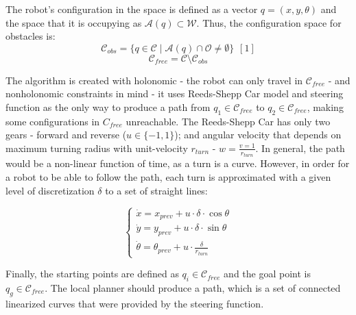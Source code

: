 \documentclass[a4paper,12pt]{article}
\DeclareRobustCommand{\[}{\begin{equation}}
\DeclareRobustCommand{\]}{\end{equation}}
\numberwithin{equation}{section}
\numberwithin{algorithm}{section}
\begin{document}
The robot's configuration in the space is defined as a vector $q=(x,y,\theta)$ and the space that it is occupying as $\mathcal{A}(q)\subset\mathcal{W}$.
Thus, the configuration space for obstacles is:
\[
\mathcal{C}_{obs}=\{q\in\mathcal{C}\mid\mathcal{A}(q)\cap\mathcal{O}\neq\emptyset \}\hspace{5pt}[1]
\]
\[
\mathcal{C}_{free}=\mathcal{C}\setminus\mathcal{C}_{obs}
\]

The algorithm is created with holonomic - the robot can only travel in $\mathcal{C}_{free}$ - and nonholonomic constraints in mind - it uses Reeds-Shepp Car model and steering function as the only way to produce a path from $q_1\in\mathcal{C}_{free}$ to $q_2\in\mathcal{C}_{free}$, making some configurations in $C_{free}$ unreachable. The Reeds-Shepp Car has only two gears - forward and reverse ($u\in\{-1,1\}$); and angular velocity that depends on maximum turning radius with unit-velocity $r_{turn}$ - $w = \frac{v=1}{r_{turn}}$. In general, the path would be a non-linear function of time, as a turn is a curve. However, in order for a robot to be able to follow the path, each turn is approximated with a given level of discretization $\delta$ to a set of straight lines:

\[
\begin{cases}
\dot{x}=x_{prev} + u\cdot\delta\cdot\cos{\theta}\\
\dot{y}=y_{prev} + u\cdot\delta\cdot\sin{\theta}\\
\dot{\theta}=\theta_{prev}+u\cdot \frac{\delta}{r_{turn}}
\end{cases}
\]

Finally, the starting points are defined as $q_i\in\mathcal{C}_{free}$ and the goal point is $q_g\in\mathcal{C}_{free}$. The local planner should produce a path, which is a set of connected linearized curves that were provided by the steering function.
\end{document}
